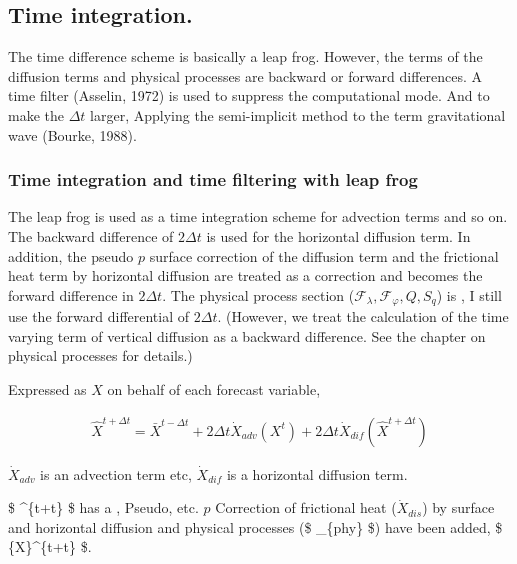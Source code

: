 \hypertarget{time-integration.}{%
\subsection{Time integration.}\label{time-integration.}}

The time difference scheme is basically a leap frog. However, the terms
of the diffusion terms and physical processes are backward or forward
differences. A time filter (Asselin, 1972) is used to suppress the
computational mode. And to make the \(\Delta t\) larger, Applying the
semi-implicit method to the term gravitational wave (Bourke, 1988).

\hypertarget{time-integration-and-time-filtering-with-leap-frog}{%
\subsubsection{Time integration and time filtering with leap
frog}\label{time-integration-and-time-filtering-with-leap-frog}}

The leap frog is used as a time integration scheme for advection terms
and so on. The backward difference of \(2 \Delta t\) is used for the
horizontal diffusion term. In addition, the pseudo \(p\) surface
correction of the diffusion term and the frictional heat term by
horizontal diffusion are treated as a correction and becomes the forward
difference in \(2 \Delta t\). The physical process section
(\({\mathcal F}_\lambda, {\mathcal F}_\varphi, Q, S_q\)) is , I still
use the forward differential of \(2 \Delta t\). (However, we treat the
calculation of the time varying term of vertical diffusion as a backward
difference. See the chapter on physical processes for details.)

Expressed as \({X}\) on behalf of each forecast variable,

\begin{eqnarray}
  \hat{X}^{t+\Delta t}
    =  \bar{X}^{t-\Delta t}
    + 2 \Delta t
      \dot{X}_{adv}\left( {X}^{t} \right)
    + 2 \Delta t
      \dot{X}_{dif}\left( \hat{X}^{t+\Delta t} \right)
\end{eqnarray}

\(\dot{X}_{adv}\) is an advection term etc, \(\dot{X}_{dif}\) is a
horizontal diffusion term.

\$ \^{}\{t+\Delta t\} \$ has a , Pseudo, etc. \(p\) Correction of
frictional heat (\(\dot{X}_{dis}\)) by surface and horizontal diffusion
and physical processes (\$ \_\{phy\} \$) have been added, \$
\{X\}\^{}\{t+\Delta t\} \$.

